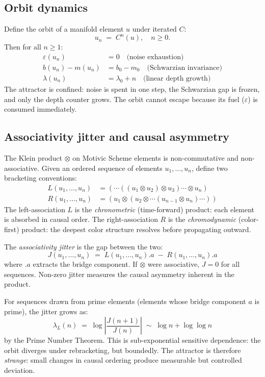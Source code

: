 \subsection{Orbit dynamics}

Define the orbit of a manifold element $u$ under iterated $C$:
\[
u_n \;=\; C^n(u), \quad n \geq 0.
\]
Then for all $n \geq 1$:
\begin{align}
\varepsilon(u_n) &= 0 \quad \text{(noise exhaustion)} \\
b(u_n) - m(u_n) &= b_0 - m_0 \quad \text{(Schwarzian invariance)} \\
\lambda(u_n) &= \lambda_0 + n \quad \text{(linear depth growth)}
\end{align}
The attractor is confined: noise is spent in one step,
the Schwarzian gap is frozen, and only the depth counter
grows. The orbit cannot escape because its fuel ($\varepsilon$)
is consumed immediately.

\subsection{Associativity jitter and causal asymmetry}

The Klein product $\otimes$ on Motivic Scheme elements is
non-commutative and non-associative. Given an ordered sequence
of elements $u_1, \ldots, u_n$, define two bracketing conventions:
\begin{align}
L(u_1, \ldots, u_n) &= (\cdots((u_1 \otimes u_2) \otimes u_3) \cdots \otimes u_n) \\
R(u_1, \ldots, u_n) &= (u_1 \otimes (u_2 \otimes \cdots (u_{n-1} \otimes u_n) \cdots))
\end{align}
The left-association $L$ is the \emph{chronometric} (time-forward)
product: each element is absorbed in causal order. The
right-association $R$ is the \emph{chromodynamic} (color-first)
product: the deepest color structure resolves before propagating
outward.

The \emph{associativity jitter} is the gap between the two:
\[
J(u_1, \ldots, u_n) \;=\; L(u_1, \ldots, u_n).a \;-\; R(u_1, \ldots, u_n).a
\]
where $.a$ extracts the bridge component. If $\otimes$ were
associative, $J = 0$ for all sequences. Non-zero jitter
measures the causal asymmetry inherent in the product.

For sequences drawn from prime elements (elements whose
bridge component $a$ is prime), the jitter grows as:
\[
\lambda_L(n) \;=\; \log\!\left|\frac{J(n+1)}{J(n)}\right|
\;\sim\; \log n + \log\log n
\]
by the Prime Number Theorem. This is sub-exponential sensitive
dependence: the orbit diverges under rebracketing, but
boundedly. The attractor is therefore \emph{strange}: small
changes in causal ordering produce measurable but controlled
deviation.

